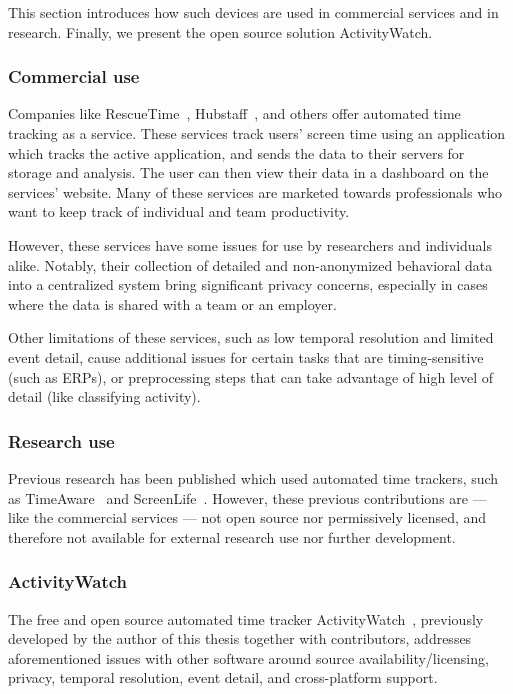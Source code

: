     This section introduces how such devices are used in commercial services and in research. Finally, we present the open source solution ActivityWatch.

    \subsubsection*{Commercial use}

        Companies like RescueTime~\cite{noauthor_rescuetime_nodate}, Hubstaff~\cite{noauthor_hubstaff_nodate}, and others offer automated time tracking as a service. These services track users' screen time using an application which tracks the active application, and sends the data to their servers for storage and analysis. The user can then view their data in a dashboard on the services' website. Many of these services are marketed towards professionals who want to keep track of individual and team productivity.

        However, these services have some issues for use by researchers and individuals alike. Notably, their collection of detailed and non-anonymized behavioral data into a centralized system bring significant privacy concerns, especially in cases where the data is shared with a team or an employer.

        Other limitations of these services, such as low temporal resolution and limited event detail, cause additional issues for certain tasks that are timing-sensitive (such as ERPs), or preprocessing steps that can take advantage of high level of detail (like classifying activity).

    \subsubsection*{Research use}

        Previous research has been published which used automated time trackers, such as TimeAware~\cite{kim_timeaware_2016} and ScreenLife~\cite{rooksby_personal_2016}. However, these previous contributions are --- like the commercial services --- not open source nor permissively licensed, and therefore not available for external research use nor further development.

    \subsubsection*{ActivityWatch}

        The free and open source automated time tracker ActivityWatch~\cite{bjareholt_activitywatch_2020}, previously developed by the author of this thesis together with contributors, addresses aforementioned issues with other software around source availability/licensing, privacy, temporal resolution, event detail, and cross-platform support.

